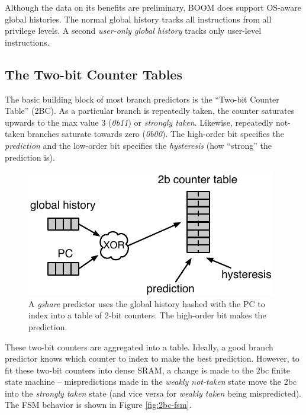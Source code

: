 Although the data on its benefits are preliminary, BOOM does support OS-aware global histories.  The normal global history tracks all instructions from all privilege levels. A second {\em user-only global history} tracks only user-level instructions. 

\subsection{The Two-bit Counter Tables}

The basic building block of most branch predictors is the ``Two-bit Counter Table'' (2BC).  As a particular branch is repeatedly taken, the counter saturates upwards to the max value 3 ({\em 0b11}) or {\em strongly taken}.  Likewise, repeatedly not-taken branches saturate towards zero ({\em 0b00}).  The high-order bit specifies the {\em prediction} and the low-order bit specifies the {\em hysteresis} (how ``strong'' the prediction is).


\begin{figure}[ht]
	\centering
	\centerline{\includegraphics[scale =1.4] {figures/2bc-prediction}}
	\caption{ \small A {\em gshare} predictor uses the global history hashed with the PC to index into a table of 2-bit counters.  The high-order bit makes the prediction.}
	\label{fig:2bc-prediction}
\end{figure}


These two-bit counters are aggregated into a table. Ideally, a good branch predictor knows which counter to index to make the best prediction. However, to fit these two-bit counters into dense SRAM, a change is made to the 2bc finite state machine -- mispredictions made in the {\em weakly not-taken} state move the 2bc into the {\em strongly taken} state (and vice versa for {\em weakly taken} being mispredicted). The FSM behavior is shown in Figure \ref{fig:2bc-fsm}.

